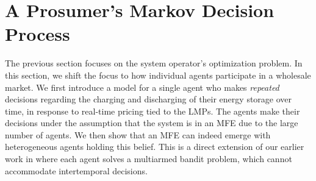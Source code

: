 \documentclass{article}
\theoremstyle{definition}
\theoremstyle{plain}
\begin{document}

\section{A Prosumer's Markov Decision Process}
\label{sec:Prosumer}
The previous section focuses on the system operator's optimization problem. In this section, we shift the focus to how individual agents participate in a wholesale market. We first introduce a model for a single agent who makes {\it repeated} decisions regarding the charging and discharging of their energy storage over time, in response to real-time pricing tied to the LMPs.  The agents make their decisions under the assumption that the system is in an MFE due to the large number of agents. We then show that an MFE can indeed emerge with heterogeneous agents holding this belief. This is a direct extension of our earlier work in \cite{ZhaoLiu_MAB} where each agent solves a multiarmed bandit problem, which cannot accommodate intertemporal decisions. 
\end{document}

